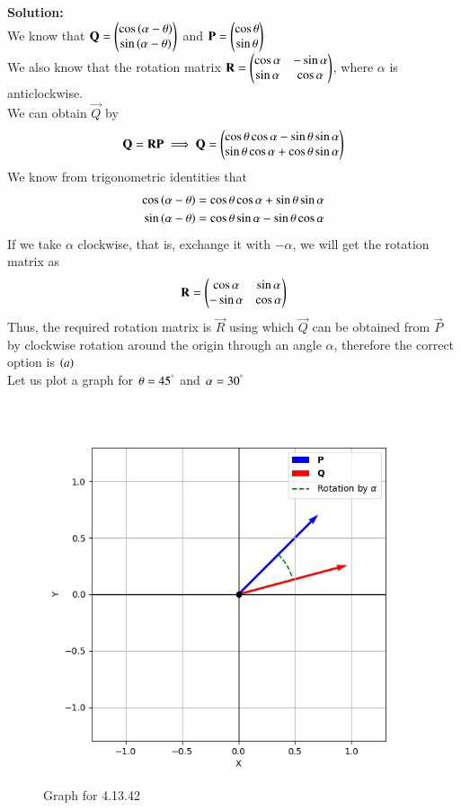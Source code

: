 \documentclass[journal,12pt,onecolumn]{IEEEtran}
\theoremstyle{remark}
\begin{document}
\textbf{Solution:}
\vspace{1mm}
\\
We know that $\mathbf{Q}=\begin{pmatrix}\cos{\ensuremath{\left(\alpha - \theta\right)}} \\ \sin{\ensuremath{\left(\alpha - \theta\right)}}\end{pmatrix}$ and $\mathbf{P}=\begin{pmatrix}\cos{\theta}\\ \sin{\theta}\end{pmatrix}$\\
We also know that the rotation matrix $\mathbf{R}=\begin{pmatrix}\cos\alpha & -\sin\alpha \\ \sin{\alpha} & \cos\alpha\end{pmatrix}$, where $\alpha$ is anticlockwise.
\\ We can obtain $\vec{Q}$ by
\begin{align}
    \mathbf{Q}=\mathbf{R}\mathbf{P} \implies \mathbf{Q}=\begin{pmatrix}\cos\theta\cos\alpha - \sin\theta\sin\alpha \\ \sin\theta\cos\alpha +\cos\theta\sin\alpha   \end{pmatrix} 
\end{align}
We know from trigonometric identities that
\begin{align}
    \cos{\ensuremath{\left(\alpha-\theta\right)}}=\cos\theta\cos\alpha + \sin\theta\sin\alpha \\\sin{\ensuremath{\left(\alpha-\theta\right)}}=\cos\theta\sin\alpha - \sin\theta\cos\alpha
\end{align}
If we take $\alpha$ clockwise, that is, exchange it with $-\alpha$, we will get the rotation matrix as 
\begin{align}
    \mathbf{R}=\begin{pmatrix}\cos\alpha & \sin\alpha \\ -\sin{\alpha} & \cos\alpha\end{pmatrix}
\end{align}
Thus, the required rotation matrix is $\vec{R}$ using which $\vec{Q}$ can be obtained from $\vec{P}$ by clockwise rotation around the origin through an angle $\alpha $, therefore the correct option is $\left(a\right)$\\ 
\vspace{1mm}
Let us plot a graph for $\theta=45^{\degree}$ and $\alpha=30^{\degree}$
\begin{figure}[H]
    \centering
    \includegraphics[width=1\columnwidth]{figs/1.png}
    \caption{Graph for 4.13.42}
    \label{fig:placeholder}
\end{figure}
\end{document}
